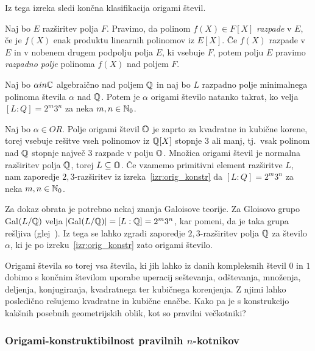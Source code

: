 Iz tega izreka sledi končna klasifikacija origami števil.

\begin{definicija}
    Naj bo $E$ razširitev polja $F$. Pravimo, da polinom $f(X) \in F[X]$ \emph{razpade} v $E$, če je $f(X)$ enak produktu linearnih polinomov iz $E[X]$. Če $f(X)$ razpade v $E$ in v nobenem drugem podpolju polja $E$, ki vsebuje $F$, potem polju $E$ pravimo \emph{razpadno polje} polinoma $f(X)$ nad poljem $F$.
\end{definicija}

\begin{izrek}
    \label{izr:orig_razp_polje}
    Naj bo $\alpha in \mathbb C$ algebraično nad poljem $\mathbb Q$ in naj bo $L$ razpadno polje minimalnega polinoma števila $\alpha$ nad $\mathbb Q$. Potem je $\alpha$ origami število natanko takrat, ko velja $[L:Q]=2^m3^n$ za neka $m, n \in \mathbb N_0$.
\end{izrek}
\begin{dokaz}
    Naj bo $\alpha \in OR$. Polje origami števil $\mathbb O$ je zaprto za kvadratne in kubične korene, torej vsebuje rešitve vseh polinomov iz $\mathbb Q[X]$ stopnje $3$ ali manj, tj.\ vsak polinom nad $\mathbb Q$ stopnje največ $3$ razpade v polju $\mathbb O$. Množica origami števil je normalna razširitev polja $\mathbb Q$, torej $L \subseteq \mathbb O$. Če vzamemo primitivni element razširitve $L$, nam zaporedje $2,3$-razširitev iz izreka~\ref{izr:orig_konstr} da $[L:Q]=2^m3^n$ za neka $m, n \in \mathbb N_0$.

    Za dokaz obrata je potrebno nekaj znanja Galoisove teorije. Za Gloisovo grupo Gal$(L/ \mathbb Q)$ velja $|$Gal$(L/ \mathbb Q)| = [L:\mathbb Q] = 2^m3^n$, kar pomeni, da je taka grupa rešljiva (glej~\cite{burnside1904}). Iz tega se lahko zgradi zaporedje $2,3$-razširitev polja $\mathbb Q$ za število $\alpha$, ki je po izreku~\ref{izr:orig_konstr} zato origami število.
\end{dokaz}

Origami števila so torej vsa števila, ki jih lahko iz danih kompleksnih števil $0$ in $1$ dobimo s končnim številom uporabe uperacij seštevanja, odštevanja, množenja, deljenja, konjugiranja, kvadratnega ter kubičnega korenjenja. Z njimi lahko posledično rešujemo kvadratne in kubične enačbe. Kako pa je s konstrukcijo kakšnih posebnih geometrijskih oblik, kot so pravilni večkotniki?

\subsubsection{Origami-konstruktibilnost pravilnih $n$-kotnikov}


